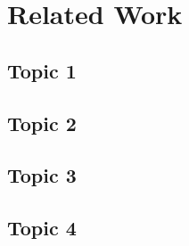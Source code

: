 \section{Related Work}

\lipsum[1]


\subsection{Topic 1}

\lipsum[1-1]

\subsection{Topic 2}

\lipsum[1-1]

\subsection{Topic 3}

\lipsum[1-1]

\subsection{Topic 4}

\lipsum[1-1]
